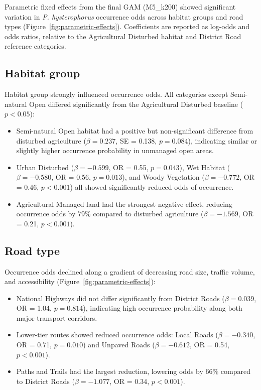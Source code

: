 Parametric fixed effects from the final GAM (M5\_k200) showed significant variation in \textit{P. hysterophorus} occurrence odds across habitat groups and road types (Figure~\ref{fig:parametric-effects}). Coefficients are reported as log-odds and odds ratios, relative to the Agricultural Disturbed habitat and District Road reference categories.

\subsection*{Habitat group}

Habitat group strongly influenced occurrence odds. All categories except Semi-natural Open differed significantly from the Agricultural Disturbed baseline ($p < 0.05$):

\begin{itemize}
    \item Semi-natural Open habitat had a positive but non-significant difference from disturbed agriculture ($\beta = 0.237$, SE = 0.138, $p = 0.084$), indicating similar or slightly higher occurrence probability in unmanaged open areas.
    \item Urban Disturbed ($\beta = -0.599$, OR = 0.55, $p = 0.043$), Wet Habitat ($\beta = -0.580$, OR = 0.56, $p = 0.013$), and Woody Vegetation ($\beta = -0.772$, OR = 0.46, $p < 0.001$) all showed significantly reduced odds of occurrence.
    \item Agricultural Managed land had the strongest negative effect, reducing occurrence odds by 79\% compared to disturbed agriculture ($\beta = -1.569$, OR = 0.21, $p < 0.001$).
\end{itemize}

\subsection*{Road type}

Occurrence odds declined along a gradient of decreasing road size, traffic volume, and accessibility (Figure~\ref{fig:parametric-effects}):

\begin{itemize}
    \item National Highways did not differ significantly from District Roads ($\beta = 0.039$, OR = 1.04, $p = 0.814$), indicating high occurrence probability along both major transport corridors.
    \item Lower-tier routes showed reduced occurrence odds: Local Roads ($\beta = -0.340$, OR = 0.71, $p = 0.010$) and Unpaved Roads ($\beta = -0.612$, OR = 0.54, $p < 0.001$).
    \item Paths and Trails had the largest reduction, lowering odds by 66\% compared to District Roads ($\beta = -1.077$, OR = 0.34, $p < 0.001$).
\end{itemize}

